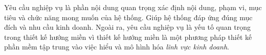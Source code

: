 Yêu cầu nghiệp vụ là phần nội dung quan trọng xác định nội dung, phạm vi, mục tiêu và chức năng mong muốn của hệ thống. Giúp hệ thống đáp ứng đúng mục đích và nhu cầu kinh doanh. Ngoài ra, yêu cầu nghiệp vụ là yếu tố quan trọng trong thiết kế hướng miền vì thiết kế hướng miền là một phương pháp thiết kế phần mềm tập trung vào việc hiểu và mô hình hóa \emph{lĩnh vực kinh doanh}.